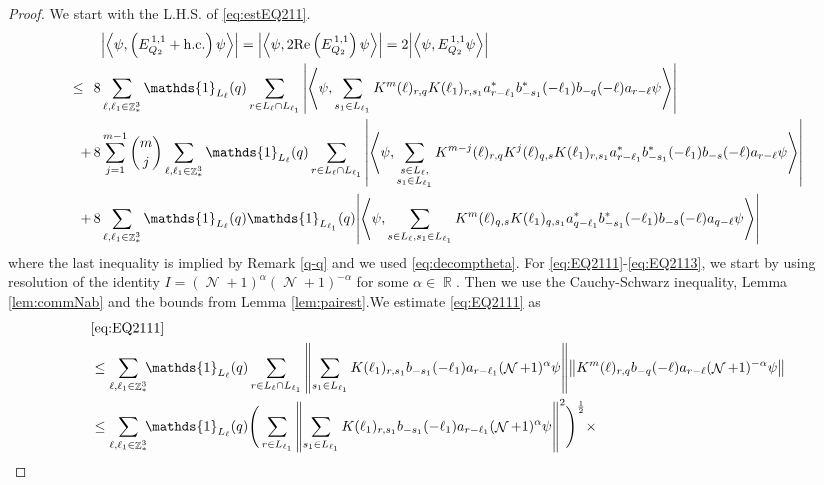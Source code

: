 \documentclass[sn-mathphys, Numbered ,a4paper]{sn-jnl}%
\DeclareMathOperator{\R}{\mathbb{R}}
\DeclareMathOperator{\Z}{\mathbb{Z}}
\DeclareMathOperator{\NN}{\mathcal{N}}
\newcommand{\half}{\frac{1}{2}}
\newcommand{\eva}[1]{\left\langle #1 \right\rangle}
\theoremstyle{plain}
\theoremstyle{definition}
\theoremstyle{remark}
\theoremstyle{plain}
\theoremstyle{definition}
\theoremstyle{remark}
\begin{document}
\begin{proof}
  We start with the L.H.S. of \eqref{eq:estEQ211}.
  \begin{align}
  	&\abs{\eva{\psi,\left(E^{\,1,1}_{Q_2}+\mathrm{h.c.}\right) \psi }} = \abs{\eva{\psi,2\mathrm{Re}\left(E^{\,1,1}_{Q_2}\right) \psi }} = 2\abs{\eva{\psi, E^{\,1,1}_{Q_2} \psi }}\nonumber\\
  	\leq\,\;8& \sum\limits_{\ell, \ell_1\in \Z^3_*} \mathds{1}_{L_{\ell}}(q) \sum\limits_{r\in L_{\ell} \cap L_{\ell_1}} \abs{\eva{\psi, \sum\limits_{s_1\in L_{\ell_1}} K^m(\ell )_{r,q} K(\ell_1)_{r,s_1} a^*_{r-\ell_1}  b^*_{-s_1}(-\ell_1) b_{-q}(-\ell) a_{r-\ell}  \psi }}\label{eq:EQ2111}\\
  	+\,8& \sum\limits_{j=1}^{m-1} {{m}\choose j} \sum\limits_{\ell, \ell_1\in \Z^3_*}\mathds{1}_{L_{\ell}}(q) \sum\limits_{r\in L_{\ell} \cap L_{\ell_1}}  \abs{\eva{\psi, \sum\limits_{\substack{s \in L_{\ell},\\ s_1\in L_{\ell_1}}} K^{m-j}(\ell)_{r,q} K^{j}(\ell)_{q,s} K(\ell_1)_{r,s_1} a^*_{r-\ell_1} b^*_{-s_1}(-\ell_1) b_{-s}(-\ell) a_{r-\ell} \psi }}\label{eq:EQ2112}\\
  	+\,8&\sum\limits_{\ell, \ell_1\in \Z^3_*} \mathds{1}_{L_{\ell}}(q) \mathds{1}_{L_{\ell_1}}(q) \abs{\eva{\psi,  \sum\limits_{s \in L_{\ell}, s_1\in L_{\ell_1}} K^m(\ell)_{q,s}K(\ell_1)_{q,s_1}
  	a^*_{q-\ell_1} b^*_{-s_1}(-\ell_1) b_{-s}(-\ell) a_{q-\ell} \psi}} \label{eq:EQ2113}
  \end{align}
  where the last inequality is implied by Remark \ref{q-q} and we used \eqref{eq:decomptheta}.
  For \eqref{eq:EQ2111}-\eqref{eq:EQ2113}, we start by using resolution of the identity $I = (\NN+1)^{\alpha}(\NN+1)^{-\alpha}$ for some $\alpha \in \R$. Then we use the Cauchy-Schwarz inequality, Lemma \ref{lem:commNab} and the bounds from Lemma \ref{lem:pairest}.We estimate \eqref{eq:EQ2111} as
\begin{align}
	&\eqref{eq:EQ2111}\nonumber\\
	&\leq\sum\limits_{\ell,\ell_1 \in \Z^3_*} \!\!\mathds{1}_{L_\ell}(q) \sum\limits_{ r \in L_\ell \cap L_{\ell_1}}    \norm{ \sum\limits_{s_1 \in L_{\ell_1}} K(\ell_1)_{r,s_1} b_{-s_1}(-\ell_1)  a_{r-\ell_1} (\NN+1)^{\alpha}\psi}\norm{ K^{m}(\ell)_{r,q}   b_{-q}(-\ell) a_{r-\ell} (\NN+1)^{-\alpha}\psi } \nonumber\\
 	&\leq \sum\limits_{\ell,\ell_1 \in \Z^3_*} \!\!\mathds{1}_{L_\ell}(q) \Bigg( \sum\limits_{r \in L_{\ell_1}} \norm{\sum\limits_{s_1 \in L_{\ell_1}} K(\ell_1)_{r,s_1} b_{-s_1}(-\ell_1) a_{r-\ell_1} (\NN+1)^{\alpha}\psi}^2\Bigg)^\half \times\nonumber\\

\end{align}
\end{proof}
\end{document}

